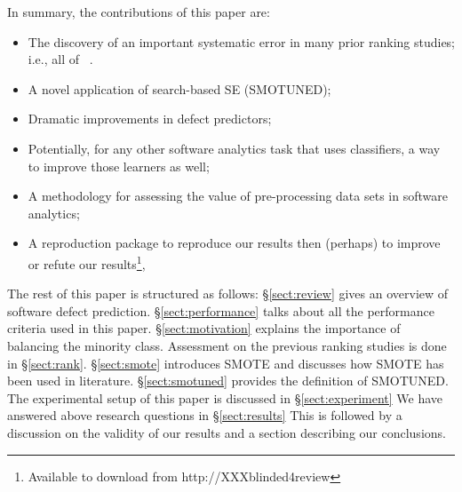 \documentclass[10pt,conference]{IEEEtran}
\newcommand{\bi}{\begin{itemize}[leftmargin=0.4cm]}
\newcommand{\ei}{\end{itemize}}
\theoremstyle{break}
\theoremstyle{break}
\newcommand{\tion}[1]{{\S}\ref{sect:#1}}
\newcommand{\sma}{{\sc SMOTE}}
\newcommand{\smb}{{\sc SMOTUNED}}
\begin{document}
\newpage
\noindent
In summary, the  contributions of this paper are:
\bi
\item The discovery of an important systematic error in  many prior ranking studies; i.e., all of
~\cite{lessmann2008benchmarking,hall2012systematic,elish2008predicting,menzies2010defect,gondra2008applying,radjenovic2013software,jiang2008techniques,wang2013using,mende2009revisiting,li2012sample,khoshgoftaar2010attribute,jiang2009variance,ghotra2015revisiting,jiang2008can,tantithamthavorn2016automated,fu2016tuning}.
\item A novel application of search-based SE ({\smb});
\item Dramatic improvements in  defect predictors;
\item Potentially, for any other software analytics task that uses classifiers, a way to improve those learners as well;
\item A methodology for assessing the value of pre-processing data sets in software analytics;
\item A reproduction package to reproduce our results then (perhaps) to improve or refute  our results\footnote{Available to download from http://XXXblinded4review},
\ei

The rest of this paper is structured as follows:
\tion{review} gives an overview of software defect prediction.
\tion{performance} talks about all the performance criteria used in this paper.
\tion{motivation} explains the importance of balancing the minority class. Assessment on the previous ranking studies is done in \tion{rank}.
\tion{smote} introduces {\sma} and discusses how {\sma} has been used in literature. \tion{smotuned} provides the definition of {\smb}. The experimental setup of this paper is discussed in \tion{experiment}
We have answered above research questions in
\tion{results} This is followed by a discussion on the validity of our results 
and a section describing our conclusions.
 


 


\end{document}
